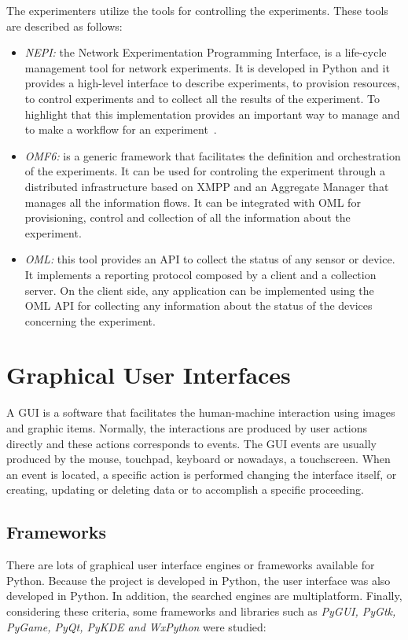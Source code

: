 The experimenters utilize the tools for controlling the experiments. These tools
are described as follows:
\begin{itemize}
\item \emph{NEPI:} the Network Experimentation Programming Interface, is a
  life-cycle management tool for network experiments. It is developed in Python
  and it provides a high-level interface to describe experiments, to provision
  resources, to control experiments and to collect all the results of the
  experiment. To highlight that this implementation provides an important way to
  manage and to make a workflow for an experiment~\cite{NEPI}.
\item \emph{\ac{OMF6}:} is a generic framework that facilitates the definition and
  orchestration of the experiments. It can be used for controling the experiment
  through a distributed infrastructure based on \ac{XMPP} and an Aggregate Manager
  that manages all the information flows. It can be integrated with \acs{OML} for
  provisioning, control and collection of all the information about the experiment.
\item \emph{\acf{OML}:} this tool provides an \ac{API} to collect
  the status of any sensor or device. It implements a reporting protocol
  composed by a client and a collection server. On the client side,
  any application can be implemented using the \ac{OML} \ac{API} for collecting any
  information about the status of the devices concerning the experiment.
\end{itemize}


\section{Graphical User Interfaces}

A \ac{GUI} is a software that facilitates the human-machine interaction using images and graphic items. Normally, the interactions are produced
by user actions directly and these actions corresponds to events. The \ac{GUI} events
are usually produced by the mouse, touchpad, keyboard or nowadays, a
touchscreen. When an event is located, a specific action is performed
changing the interface itself, or creating, updating or deleting data or to
accomplish a specific proceeding.


\subsection{Frameworks}

There are lots of graphical user interface engines or frameworks available for
Python. Because the project is developed in Python, the user interface was also
developed in Python. In addition, the searched engines are multiplatform. Finally, considering these criteria, some frameworks and
libraries  such as \emph{PyGUI, PyGtk, PyGame, PyQt, PyKDE and WxPython} were studied:

